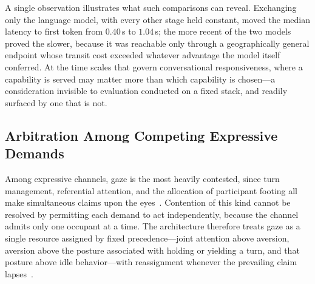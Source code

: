 A single observation illustrates what such comparisons can reveal. Exchanging
only the language model, with every other stage held constant, moved the median
latency to first token from $0.40$\,s to $1.04$\,s; the more recent of the two
models proved the slower, because it was reachable only through a
geographically general endpoint whose transit cost exceeded whatever advantage
the model itself conferred. At the time scales that govern conversational
responsiveness, where a capability is served may matter more than which
capability is chosen---a consideration invisible to evaluation conducted on a
fixed stack, and readily surfaced by one that is not.


\subsection{Arbitration Among Competing Expressive Demands}

Among expressive channels, gaze is the most heavily contested, since turn
management, referential attention, and the allocation of participant footing
all make simultaneous claims upon the eyes~\cite{mutlu2009footing,
admoni2017social}. Contention of this kind cannot be resolved by permitting
each demand to act independently, because the channel admits only one occupant
at a time. The architecture therefore treats gaze as a single resource assigned
by fixed precedence---joint attention above aversion, aversion above the
posture associated with holding or yielding a turn, and that posture above idle
behavior---with reassignment whenever the prevailing claim
lapses~\cite{andrist2014aversion, kipp2015gazeattention}.


